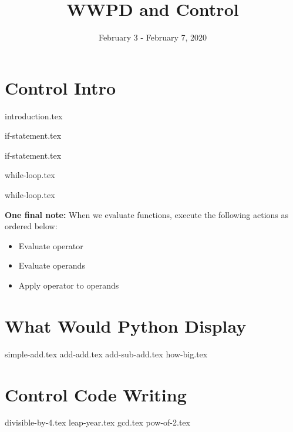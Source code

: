 \documentclass{exam}
\title{WWPD and Control}
\date{February 3 - February 7, 2020}
\begin{document}
\maketitle
\section{Control Intro}
{introduction.tex}


{if-statement.tex}

{if-statement.tex}

{while-loop.tex}

{while-loop.tex}

\vspace{5}                                                                                                                                                                                                                                                                                                                                                                                                                                                                                                                                                                                                                                                                                                                                                                                                                                                                                                                                                                              
\textbf{One final note: } When we evaluate functions, execute the following actions as ordered below:
\begin{itemize}
  \item Evaluate operator
  \item Evaluate operands 
  \item Apply operator to operands
\end{itemize}


\section{What Would Python Display}
\begin{questions}
{simple-add.tex}
{add-add.tex}
{add-sub-add.tex}
{how-big.tex}

\end{questions}
\newpage
\section{Control Code Writing}
\begin{questions}
{divisible-by-4.tex}
{leap-year.tex}
{gcd.tex}
{pow-of-2.tex}
\end{questions}
\end{document}
